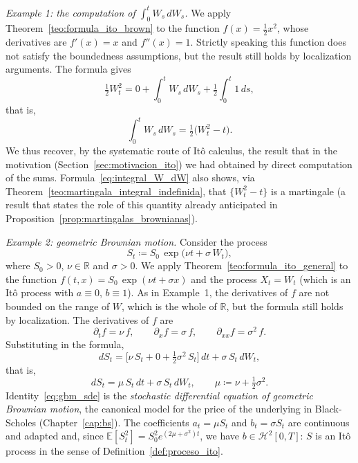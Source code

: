 \documentclass[11pt,a4paper,oneside]{report}
\theoremstyle{plain}
\theoremstyle{definition}
\theoremstyle{remark}
\newcommand{\R}{\mathbb{R}}
\newcommand{\E}{\mathbb{E}}
\newcommand{\1}{\mathbf{1}}
\newcommand{\eqdef}{\coloneqq}
\begin{document}
\medskip

\noindent\textit{Example 1: the computation of $\int_0^t W_s\, dW_s$.}
We apply Theorem~\ref{teo:formula_ito_brown} to the function
$f(x) = \tfrac{1}{2} x^2$, whose derivatives are $f'(x) = x$ and
$f''(x) = 1$. Strictly speaking this function does not satisfy the
boundedness assumptions, but the result still holds by localization
arguments. The formula gives
\begin{equation*}
  \tfrac{1}{2} W_t^2 = 0 + \int_0^t W_s\, dW_s
                       + \tfrac{1}{2} \int_0^t 1\, ds,
\end{equation*}
that is,
\begin{equation}\label{eq:integral_W_dW}
  \int_0^t W_s\, dW_s = \tfrac{1}{2}\bigl(W_t^2 - t\bigr).
\end{equation}
We thus recover, by the systematic route of Itô calculus, the result
that in the motivation (Section~\ref{sec:motivacion_ito}) we had
obtained by direct computation of the sums.
Formula~\eqref{eq:integral_W_dW} also shows, via
Theorem~\ref{teo:martingala_integral_indefinida}, that
$\{W_t^2 - t\}$ is a martingale (a result that states the role of
this quantity already anticipated in
Proposition~\ref{prop:martingalas_brownianas}).

\medskip

\noindent\textit{Example 2: geometric Brownian motion.} Consider the
process
\begin{equation*}
  S_t \eqdef S_0\, \exp\bigl(\nu t + \sigma\, W_t\bigr),
\end{equation*}
where $S_0 > 0$, $\nu \in \R$ and $\sigma > 0$. We apply
Theorem~\ref{teo:formula_ito_general} to the function
$f(t, x) = S_0\, \exp(\nu t + \sigma x)$ and the process $X_t = W_t$
(which is an Itô process with $a \equiv 0$, $b \equiv 1$). As in Example~1, the derivatives of $f$ are not bounded on the range of $W$, which is the whole of $\R$, but the formula still holds by localization. The
derivatives of $f$ are
\begin{equation*}
  \partial_t f = \nu\, f, \qquad
  \partial_x f = \sigma\, f, \qquad
  \partial_{xx} f = \sigma^2\, f.
\end{equation*}
Substituting in the formula,
\begin{equation*}
  dS_t = \bigl[\nu\, S_t + 0 + \tfrac{1}{2} \sigma^2\, S_t\bigr]\, dt
        + \sigma\, S_t\, dW_t,
\end{equation*}
that is,
\begin{equation}\label{eq:gbm_sde}
  \boxed{\; dS_t = \mu\, S_t\, dt + \sigma\, S_t\, dW_t, \qquad
  \mu \eqdef \nu + \tfrac{1}{2}\sigma^2. \;}
\end{equation}
Identity~\eqref{eq:gbm_sde} is the \emph{stochastic differential
equation of geometric Brownian motion}, the canonical model for the
price of the underlying in Black-Scholes (Chapter~\ref{cap:bs}). The coefficients $a_t = \mu S_t$ and $b_t = \sigma S_t$ are continuous and adapted and, since $\E[S_t^2] = S_0^2 e^{(2\mu + \sigma^2) t}$, we have $b \in \mathcal{H}^2[0, T]$: $S$ is an Itô process in the sense of Definition~\ref{def:proceso_ito}.
\end{document}
